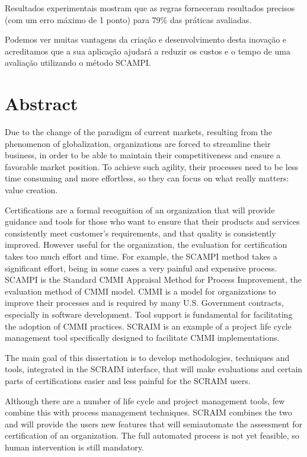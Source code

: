 Resultados experimentais mostram que as regras forneceram resultados precisos (com um erro máximo de 1 ponto) para 79\% das práticas avaliadas.

Podemos ver muitas vantagens da criação e desenvolvimento desta inovação e acreditamos que a sua aplicação ajudará a reduzir os custos e o tempo de uma avaliação utilizando o método SCAMPI.




\chapter*{Abstract}

Due to the change of the paradigm of current markets, resulting from the phenomenon of globalization, organizations are forced to streamline their business, in order to be able to maintain their competitiveness and ensure a favorable market position. To achieve such agility, their processes need to be less time consuming and more effortless, so they can focus on what really matters: value creation.

Certifications are a formal recognition of an organization that will provide guidance and tools for those who want to ensure that their products and services consistently meet customer's requirements, and that quality is consistently improved. However useful for the organization, the evaluation for certification takes too much effort and time. For example, the SCAMPI method takes a significant effort, being in some cases a very painful and expensive process. SCAMPI is the Standard CMMI Appraisal Method for Process Improvement, the evaluation method of CMMI model. CMMI is a model for organizations to improve their processes and is required by many U.S. Government contracts, especially in software development. 
Tool support is fundamental for facilitating the adoption of CMMI practices. SCRAIM is an example of a project life cycle management tool specifically designed to facilitate CMMI implementations.

The main goal of this dissertation is to develop methodologies, techniques and tools, integrated in the SCRAIM interface, that will make evaluations and certain parts of certifications easier and less painful for the SCRAIM users.

Although there are a number of life cycle and project management tools, few combine this with process management techniques. SCRAIM combines the two and will provide the users new features that will semiautomate the assessment for certification of an organization. The full automated process is not yet feasible, so human intervention is still mandatory. 


